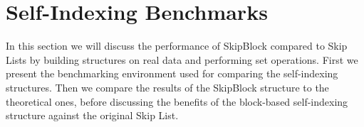 \chapter{Self-Indexing Benchmarks}{%
In this section we will discuss the performance of SkipBlock compared to Skip
Lists by building structures on real data and performing set operations. First
we present the benchmarking environment used for comparing the self-indexing
structures. Then we compare the results of the SkipBlock structure to the
theoretical ones, before discussing the benefits of the block-based
self-indexing structure against the original Skip List. }%
\label{chap:self-indexing-bench}
